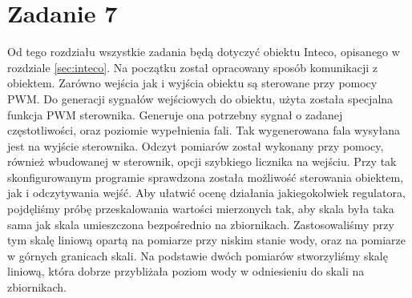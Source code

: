 \chapter{Zadanie 7}
Od tego rozdziału wszystkie zadania będą dotyczyć obiektu Inteco,
opisanego w rozdziale \ref{sec:inteco}. Na początku został opracowany sposób
komunikacji z obiektem. Zarówno wejścia jak i wyjścia obiektu są sterowane
przy pomocy PWM. Do generacji sygnałów wejściowych do obiektu, użyta
została specjalna funkcja PWM sterownika. Generuje ona potrzebny sygnał
o zadanej częstotliwości, oraz poziomie wypełnienia fali. Tak wygenerowana
fala wysyłana jest na wyjście sterownika. Odczyt pomiarów został
wykonany przy pomocy, również wbudowanej w sterownik, opcji szybkiego licznika
na wejściu. Przy tak skonfigurowanym programie sprawdzona została możliwość
sterowania obiektem, jak i odczytywania wejść. Aby ułatwić ocenę działania
jakiegokolwiek regulatora, pojdęliśmy próbę przeskalowania wartości mierzonych
tak, aby skala była taka sama jak skala umieszczona bezpośrednio na zbiornikach.
Zastosowaliśmy przy tym skalę liniową opartą na pomiarze przy niskim stanie
wody, oraz na pomiarze w górnych granicach skali. Na podstawie dwóch pomiarów
stworzyliśmy skalę liniową, która dobrze przybliżała poziom wody w odniesieniu
do skali na zbiornikach.
